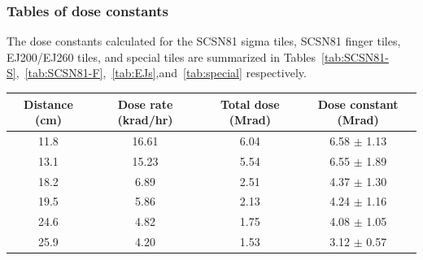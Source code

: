 \subsubsection{Tables of dose constants\label{sec:ana-res-tables}}
The dose constants calculated for the SCSN81 sigma tiles, SCSN81 finger tiles, EJ200/EJ260 tiles, and special tiles are summarized in Tables~\ref{tab:SCSN81-S},~\ref{tab:SCSN81-F},~\ref{tab:EJs},and~\ref{tab:special} respectively.

\begin{table}[htbh]
\begin{center}
\begin{tabular}{|c|c|c|c|}
\hline
Distance (cm) & Dose rate (krad/hr) & Total dose (Mrad) & Dose constant (Mrad)\\
\hline
\hline
11.8 & 16.61 & 6.04 & 6.58 $\pm$ 1.13\\
13.1 & 15.23 & 5.54 & 6.55 $\pm$ 1.89\\
18.2 & 6.89 & 2.51 & 4.37 $\pm$ 1.30\\
19.5 & 5.86 & 2.13 & 4.24 $\pm$ 1.16\\
24.6 & 4.82 & 1.75 & 4.08 $\pm$ 1.05\\
25.9 & 4.20 & 1.53 & 3.12 $\pm$ 0.57\\
\hline
\end{tabular}
\end{center}
\end{table}



